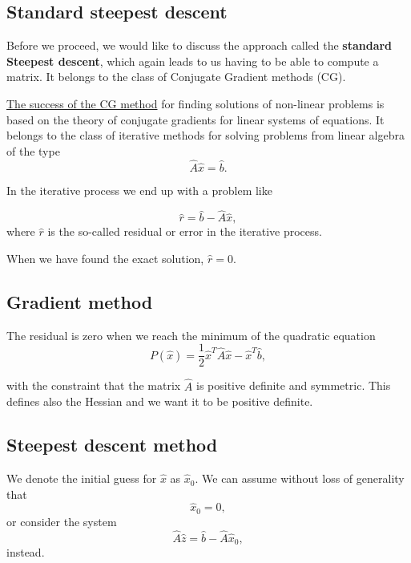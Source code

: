 \documentclass[%
oneside,                 %
final,                   %
10pt]{article}
\begin{document}
\subsection{Standard steepest descent}

Before we proceed, we would like to discuss the approach called the
\textbf{standard Steepest descent}, which again leads to us having to be able
to compute a matrix. It belongs to the class of Conjugate Gradient methods (CG).

\href{{https://www.cs.cmu.edu/~quake-papers/painless-conjugate-gradient.pdf}}{The success of the CG method}
for finding solutions of non-linear problems is based on the theory
of conjugate gradients for linear systems of equations. It belongs to
the class of iterative methods for solving problems from linear
algebra of the type 
\begin{equation*} 
\hat{A}\hat{x} = \hat{b}.
\end{equation*} 

In the iterative process we end up with a problem like

\begin{equation*}
  \hat{r}= \hat{b}-\hat{A}\hat{x},
\end{equation*}
where $\hat{r}$ is the so-called residual or error in the iterative process.

When we have found the exact solution, $\hat{r}=0$.

\subsection{Gradient method}

The residual is zero when we reach the minimum of the quadratic equation
\begin{equation*}
  P(\hat{x})=\frac{1}{2}\hat{x}^T\hat{A}\hat{x} - \hat{x}^T\hat{b},
\end{equation*}

with the constraint that the matrix $\hat{A}$ is positive definite and
symmetric.  This defines also the Hessian and we want it to be  positive definite.  

\subsection{Steepest descent  method}

We denote the initial guess for $\hat{x}$ as $\hat{x}_0$. 
We can assume without loss of generality that
\begin{equation*}
\hat{x}_0=0,
\end{equation*}
or consider the system
\begin{equation*}
\hat{A}\hat{z} = \hat{b}-\hat{A}\hat{x}_0,
\end{equation*}
instead.
\end{document}
